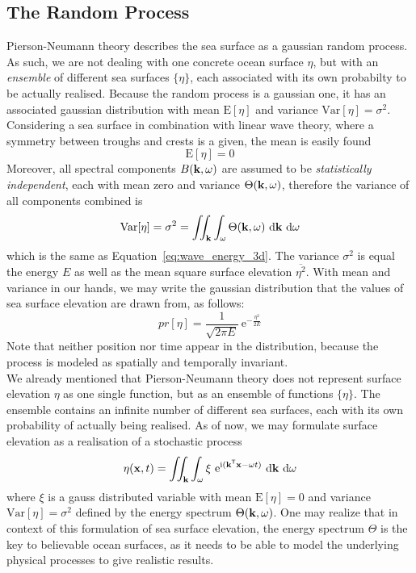 \subsection{The Random Process}
Pierson-Neumann theory describes the sea surface as a gaussian random process.
As such, we are not dealing with one concrete ocean surface $\eta$, but with an
\emph{ensemble} of different sea surfaces $\{\eta\}$, each associated with its
own probabilty to be actually realised. Because the random process is a
gaussian one, it has an associated gaussian distribution with mean
$\mathrm{E}[\eta]$ and variance $\mathrm{Var}[\eta] = \sigma^2$. Considering a
sea surface in combination with linear wave theory, where a symmetry between
troughs and crests is a given, the mean is easily found
\begin{equation}
 \mathrm{E}[\eta] = 0
\end{equation}
%
Moreover, all spectral components $B(\mathbf{k},\omega)$ are assumed to be
\emph{statistically independent}, each with mean zero and variance $\Theta(\mathbf{k},\omega)$,
therefore the variance of all components combined is
\begin{equation}
\label{eq:random_process_variance}
\mathrm{Var}[\eta] = \sigma^2 = \iint_{\mathbf{k}}
\int_{\omega}\Theta(\mathbf{k},\omega)~\mathrm{d}\mathbf{k}~\mathrm{ d}\omega
\end{equation}
which is the same as Equation~\ref{eq:wave_energy_3d}. The variance
$\sigma^2$ is equal the energy $E$ as well as the mean square surface elevation
$\overline{\eta^2}$. With mean and variance in our hands, we may write
the gaussian distribution that the values of sea surface elevation are drawn
from, as follows:
\begin{equation}
\label{eq:gaussian_dist}
 pr[\eta] = \frac{1}{\sqrt{2\pi E}}~\mathrm{e}^{-\frac{\eta^2}{2E}}
\end{equation}
Note that neither position nor time appear in the distribution, because the
process is modeled as spatially and temporally invariant.\\

We already mentioned that Pierson-Neumann theory does not represent surface
elevation $\eta$ as one single function, but as an ensemble of functions
$\{\eta\}$. The ensemble contains an infinite number of different sea surfaces,
each with its own probability of actually being realised. As of now, we may
formulate surface elevation as a realisation of a stochastic process
\begin{equation}
\label{eq:surface_elevation_gauss}
 \eta(\mathbf{x}, t) = \iint_{\mathbf{k}}\int_{\omega} \xi
~\mathrm{e}^{\mathrm{i}(\mathbf{k}^{\mathsf{T}}\mathbf{x}-
\omega t)}~
\mathrm{d}\mathbf{k}~\mathrm{d}\omega
\end{equation}
where $\xi$ is a gauss distributed variable with mean $\mathrm{E}[\eta] = 0$ and
variance $\mathrm{Var}[\eta] = \sigma^2$ defined by the energy spectrum
$\Theta(\mathbf{k}, \omega)$. One may realize that in context of this formulation
of sea surface elevation, the energy spectrum $\Theta$ is the key to believable
ocean surfaces, as it needs to be able to model the underlying physical
processes to give realistic results.\\


